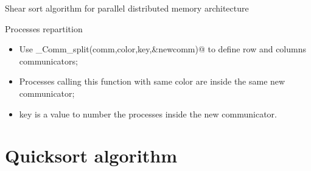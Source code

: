 \documentclass[compress,10pt,aspectratio=169]{beamer}
\begin{document}
\begin{frame}[fragile]{Shear sort algorithm for parallel distributed memory architecture}
\begin{block}{\small Processes repartition}
\begin{multicols}{2}
    \begin{minipage}{0.5\textwidth}
        \begin{itemize}
            \item Use \verb@MPI_Comm_split(comm,color,key,&newcomm)@ to define row and columns communicators;
            \item Processes calling this function with same color are inside the same new communicator;
            \item key is a value to number the processes inside the new communicator.
        \end{itemize}
    \end{minipage}
\end{multicols}
    \end{block}
\end{frame}

\section{Quicksort algorithm}
\end{document}
